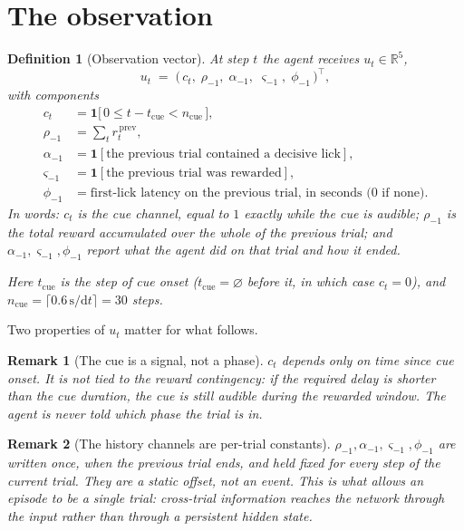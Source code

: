 \documentclass[11pt]{article}
\newtheorem{remark}{Remark}
\newtheorem{definition}{Definition}
\newcommand{\R}{\mathbb{R}}
\newcommand{\1}{\mathbf{1}}
\begin{document}
\section{The observation}\label{sec:obs}

\begin{definition}[Observation vector]
At step $t$ the agent receives $u_t \in \R^{5}$,
\begin{equation}
  u_t \;=\; \bigl(\, c_t,\; \rho_{-1},\; \alpha_{-1},\; \varsigma_{-1},\; \phi_{-1} \,\bigr)^{\!\top},
\end{equation}
with components
\begin{align}
  c_t        &= \1\bigl[\,0 \le t - t_{\mathrm{cue}} < n_{\mathrm{cue}}\,\bigr], \\
  \rho_{-1}  &= \textstyle\sum_{t} r_t^{\,\mathrm{prev}}, \\
  \alpha_{-1}    &= \1[\text{the previous trial contained a decisive lick}], \\
  \varsigma_{-1} &= \1[\text{the previous trial was rewarded}], \\
  \phi_{-1}      &= \text{first-lick latency on the previous trial, in seconds ($0$ if none)}.
\end{align}
In words: $c_t$ is the \emph{cue channel}, equal to $1$ exactly while the cue is audible;
$\rho_{-1}$ is the total reward accumulated over the whole of the previous trial; and
$\alpha_{-1}, \varsigma_{-1}, \phi_{-1}$ report what the agent did on that trial and how it
ended.

Here $t_{\mathrm{cue}}$ is the step of cue onset ($t_{\mathrm{cue}} = \varnothing$ before it,
in which case $c_t = 0$), and $n_{\mathrm{cue}} = \lceil 0.6\,\mathrm{s}/\mathrm{d}t \rceil = 30$
steps.
\end{definition}

Two properties of $u_t$ matter for what follows.

\begin{remark}[The cue is a signal, not a phase]
$c_t$ depends only on time since cue onset. It is not tied to the reward contingency: if the
required delay is shorter than the cue duration, the cue is still audible during the rewarded
window. The agent is never told which phase the trial is in.
\end{remark}

\begin{remark}[The history channels are per-trial constants]
$\rho_{-1},\alpha_{-1},\varsigma_{-1},\phi_{-1}$ are written once, when the previous trial
ends, and held fixed for every step of the current trial. They are a static offset, not an
event. This is what allows an episode to be a single trial: cross-trial information reaches
the network through the input rather than through a persistent hidden state.
\end{remark}
\end{document}
